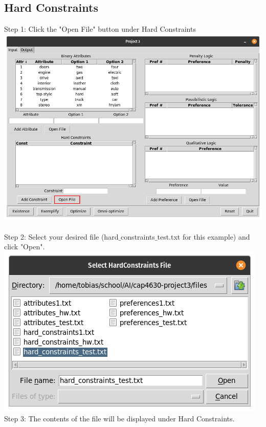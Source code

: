 \documentclass[titlepage]{article}
\begin{document}
\subsection{Hard Constraints}
Step 1: Click the "Open File" button under Hard Constraints\\
\includegraphics[scale=0.3]{input_constraints} \\\\
Step 2: Select your desired file (hard$\_$constraints$\_$test.txt for this example) and click "Open".\\
\includegraphics[scale=0.3]{select_constraints}\\
Step 3: The contents of the file will be displayed under Hard Constraints.\\
\end{document}
